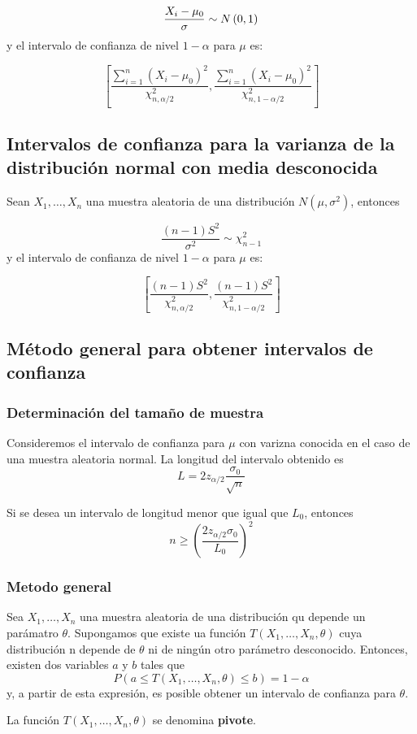 $$\frac{X_i-\mu_0}{\sigma}\sim N\left(0,1\right)$$ y  el intervalo de confianza de nivel $1-\alpha$ para $\mu$ es:

$$\left[\frac{\sum_{i=1}^{n}(X_i-\mu_0)^2}{\chi^2_{n,\alpha/2}},\frac{\sum_{i=1}^{n}(X_i-\mu_0)^2}{\chi^2_{n,1-\alpha/2}}\right]$$

\subsection{Intervalos de confianza para la varianza de la distribución normal con media desconocida}
Sean $X_1,\dots,X_n$ una muestra aleatoria de una distribución $N(\mu,\sigma^2)$, entonces

$$\frac{(n-1)S^2}{\sigma^2}\sim\chi_{n-1}^2$$ y  el intervalo de confianza de nivel $1-\alpha$ para $\mu$ es:

$$\left[\frac{(n-1)S^2}{\chi^2_{n,\alpha/2}},\frac{(n-1)S^2}{\chi^2_{n,1-\alpha/2}}\right]$$

\subsection{Método general para obtener intervalos de confianza}
\subsubsection{Determinación del tamaño de muestra}
Consideremos el intervalo de confianza para $\mu$ con varizna conocida en el caso de una muestra aleatoria normal. La longitud del intervalo obtenido es $$L = 2z_{\alpha/2}\frac{\sigma_0}{\sqrt{n}}$$

Si se desea un intervalo de longitud menor que igual que $L_0$, entonces $$n\geq\left(\frac{2z_{\alpha/2}\sigma_0}{L_0}\right)^2$$

\subsubsection{Metodo general}
Sea $X_1,\dots,X_n$ una muestra aleatoria de una distribución qu depende un parámatro $\theta$. Supongamos que existe ua función $T(X_1,\dots,X_n,\theta)$ cuya distribución n depende de $\theta$ ni de ningún otro parámetro desconocido. Entonces, existen dos variables $a$ y $b$ tales que
	$$P(a\leq T(X_1,\dots,X_n,\theta)\leq b) = 1-\alpha$$
y, a partir de esta expresión, es posible obtener un intervalo de confianza para $\theta$.

La función $T(X_1,\dots,X_n,\theta)$ se denomina \textbf{pivote}.

